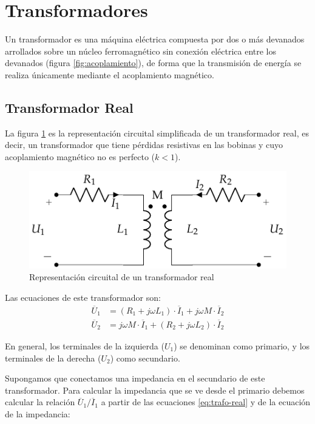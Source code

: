 \section{Transformadores}
\label{sec:transformadores}

Un transformador es una máquina eléctrica compuesta por dos o más devanados arrollados sobre un núcleo ferromagnético sin conexión eléctrica entre los devanados (figura \ref{fig:acoplamiento}), de forma que la transmisión de energía se realiza únicamente mediante el acoplamiento magnético.

\subsection{Transformador Real}
\label{sec:transformador-real}

La figura \ref{fig:trafo-real} es la representación circuital simplificada de un transformador real, es decir, un transformador que tiene pérdidas resistivas en las bobinas y cuyo acoplamiento magnético no es perfecto ($k < 1$).

\begin{figure}
  \centering
  \includegraphics[height=0.2\textheight]{../figs/Trafo_Real.pdf}
  \caption{Representación circuital de un transformador real}
  \label{fig:trafo-real}
\end{figure}
Las ecuaciones de este transformador son:
\begin{align}
  \label{eq:trafo-real}
  \overline{U}_1 &= (R_1 + j \omega L_1) \cdot \overline{I}_1 + j \omega M \cdot\overline{I}_2\\
  \overline{U}_2 &= j \omega M \cdot \overline{I}_1 + (R_2 + j \omega L_2) \cdot \overline{I}_2
\end{align}

En general, los terminales de la izquierda ($U_1$) se denominan como primario, y los terminales de la derecha ($U_2$) como secundario.

Supongamos que conectamos una impedancia en el secundario de este transformador. Para calcular la impedancia que se ve desde el primario debemos calcular la relación $\overline{U}_1/\overline{I}_1$ a partir de las ecuaciones \ref{eq:trafo-real} y de la
ecuación de la impedancia:

